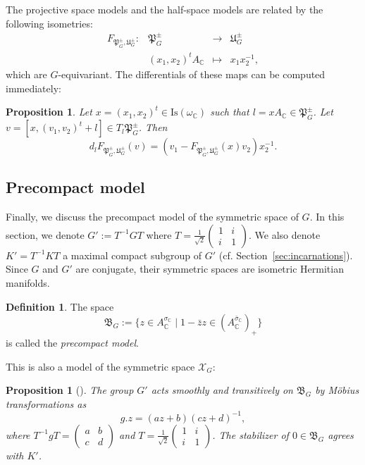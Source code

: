 \documentclass[oneside,11pt]{amsart}
\newtheorem{prop}[thm]{Proposition}
\theoremstyle{definition}
\newtheorem{defn}[thm]{Definition}
\theoremstyle{remark}
\numberwithin{thm}{section}
\numberwithin{equation}{section}
\begin{document}
The projective space models and the half-space models are related by the following isometries: 
$$\begin{matrix}
F_{\mathfrak{P}_G^\pm,\mathfrak U_G^\pm} \colon & \mathfrak{P}_G^\pm & \to & \mathfrak U_G^\pm\\
 & (x_1,x_2)^tA_\mathbb C & \mapsto & x_1x_2^{-1},
\end{matrix}$$
which are $G$-equivariant. The differentials of these maps can be computed immediately:

\begin{prop}
    Let $x=(x_1,x_2)^t\in\mathrm{Is}(\omega_\mathbb C)$ such that $l=xA_\mathbb C\in\mathfrak{P}_G^\pm$. Let $v=[x,(v_1,v_2)^t+l]\in T_{l}\mathfrak{P}_G^\pm$. Then 
    $$d_lF_{\mathfrak{P}_G^\pm,\mathfrak U_G^\pm}(v)=(v_1-F_{\mathfrak{P}_G^\pm,\mathfrak U_G^\pm}(x) v_2)x_2^{-1}.$$ 
\end{prop}



\subsection{Precompact model}\label{sec:precompact_real}

Finally, we discuss the precompact model of the symmetric space of $G$. In this section, we denote
    $G':=T^{-1}GT$ where $T=\frac{1}{\sqrt{2}}\begin{pmatrix}
        1 & i\\
        i & 1
    \end{pmatrix}$.
We also denote $K'=T^{-1}KT$ a maximal compact subgroup of $G'$ (cf. Section~\ref{sec:incarnations}). Since $G$ and $G'$ are conjugate, their symmetric spaces are isometric Hermitian manifolds.

\begin{defn}
    The space
    $$\mathfrak{B}_G:=\{z\in A^{\sigma_\mathbb C}_\mathbb C\mid 1-\bar zz\in (A^{\bar\sigma_\mathbb C}_\mathbb  C)_+\}$$
    is called the \emph{precompact model}.
\end{defn}

\noindent This is also a model of the symmetric space $\mathcal X_{G}$:

\begin{prop}[{\cite[Proposition~5.23]{ABRRW}}]
    The group $G'$ acts smoothly and transitively on $\mathfrak{B}_G$ by M\"obius transformations as
    \[g.z=(az+b)(cz+d)^{-1},\] 
    where $T^{-1}gT=\begin{pmatrix}
        a & b \\
        c & d
    \end{pmatrix}$ and $T=\frac{1}{\sqrt{2}}\begin{pmatrix}
        1 & i\\
        i & 1
    \end{pmatrix}$. The stabilizer of $0\in\mathfrak{B}_G$ agrees with $K'$.
\end{prop}
\end{document}
